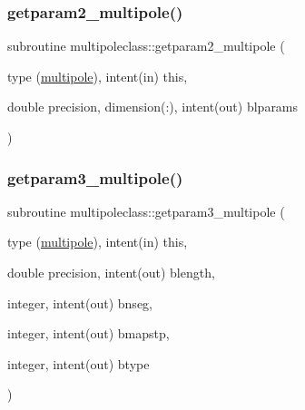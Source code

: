\mbox{\label{namespacemultipoleclass_a4ee9aad22a430e9de1e1abb8ea21b058}} 
\subsubsection{\texorpdfstring{getparam2\_multipole()}{getparam2\_multipole()}}
{\footnotesize\ttfamily subroutine multipoleclass\+::getparam2\+\_\+multipole (\begin{DoxyParamCaption}\item[{type (\mbox{\hyperlink{namespacemultipoleclass_structmultipoleclass_1_1multipole}{multipole}}), intent(in)}]{this,  }\item[{double precision, dimension(\+:), intent(out)}]{blparams }\end{DoxyParamCaption})}

\mbox{\label{namespacemultipoleclass_a75142a086a96c998e2ce878857d50179}} 
\subsubsection{\texorpdfstring{getparam3\_multipole()}{getparam3\_multipole()}}
{\footnotesize\ttfamily subroutine multipoleclass\+::getparam3\+\_\+multipole (\begin{DoxyParamCaption}\item[{type (\mbox{\hyperlink{namespacemultipoleclass_structmultipoleclass_1_1multipole}{multipole}}), intent(in)}]{this,  }\item[{double precision, intent(out)}]{blength,  }\item[{integer, intent(out)}]{bnseg,  }\item[{integer, intent(out)}]{bmapstp,  }\item[{integer, intent(out)}]{btype }\end{DoxyParamCaption})}

\mbox{\label{namespacemultipoleclass_adba27354e821268f6cb786c415a5bc91}} 
